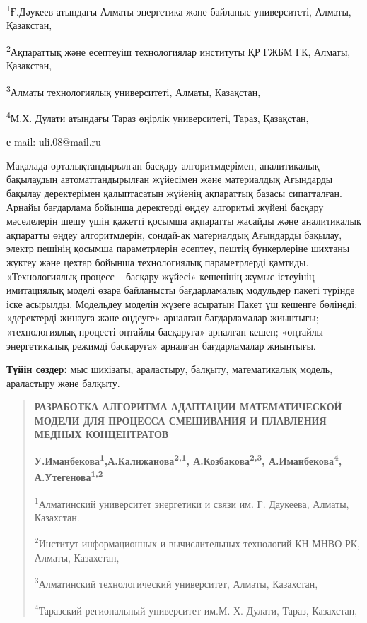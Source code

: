 \textsuperscript{1}Ғ.Дәукеев атындағы Алматы энергетика және байланыс
университеті, Алматы, Қазақстан,

\textsuperscript{2}Ақпараттық және есептеуіш технологиялар институты ҚР
ҒЖБМ ҒК, Алматы, Қазақстан,

\textsuperscript{3}Алматы технологиялық университеті, Алматы, Қазақстан,

\textsuperscript{4}М.Х. Дулати атындағы Тараз өңірлік университеті,
Тараз, Қазақстан,

е-mail: uli.08@mail.ru

Мақалада орталықтандырылған басқару алгоритмдерімен, аналитикалық
бақылаудың автоматтандырылған жүйесімен және материалдық Ағындарды
бақылау деректерімен қалыптасатын жүйенің ақпараттық базасы сипатталған.
Арнайы бағдарлама бойынша деректерді өңдеу алгоритмі жүйені басқару
мәселелерін шешу үшін қажетті қосымша ақпаратты жасайды және
аналитикалық ақпаратты өңдеу алгоритмдерін, сондай-ақ материалдық
Ағындарды бақылау, электр пешінің қосымша параметрлерін есептеу, пештің
бункерлеріне шихтаны жүктеу және цехтар бойынша технологиялық
параметрлерді қамтиды. «Технологиялық процесс -- басқару жүйесі»
кешенінің жұмыс істеуінің имитациялық моделі өзара байланысты
бағдарламалық модульдер пакеті түрінде іске асырылды. Модельдеу моделін
жүзеге асыратын Пакет үш кешенге бөлінеді: «деректерді жинауға және
өңдеуге» арналған бағдарламалар жиынтығы; «технологиялық процесті
оңтайлы басқаруға» арналған кешен; «оңтайлы энергетикалық режимді
басқаруға» арналған бағдарламалар жиынтығы.

\textbf{Түйін сөздер:} мыс шикізаты, араластыру, балқыту, математикалық
модель, араластыру және балқыту.

\begin{quote}
\textbf{РАЗРАБОТКА АЛГОРИТМА АДАПТАЦИИ МАТЕМАТИЧЕСКОЙ МОДЕЛИ ДЛЯ
ПРОЦЕССА СМЕШИВАНИЯ И ПЛАВЛЕНИЯ МЕДНЫХ КОНЦЕНТРАТОВ}

\textbf{У.Иманбекова\textsuperscript{1},А.Калижанова\textsuperscript{2,1},
А.Козбакова\textsuperscript{2,3}, А.Иманбекова\textsuperscript{4},
А.Утегенова\textsuperscript{1,2}}

\textsuperscript{1}Алматинский университет энергетики и связи им. Г.
Даукеева, Алматы, Казахстан.

\textsuperscript{2}Институт информационных и вычислительных технологий
КН МНВО РК, Алматы, Казахстан,

\textsuperscript{3}Алматинский технологический университет, Алматы,
Казахстан,

\textsuperscript{4}Таразский региональный университет им.М. Х. Дулати,
Тараз, Казахстан,
\end{quote}


